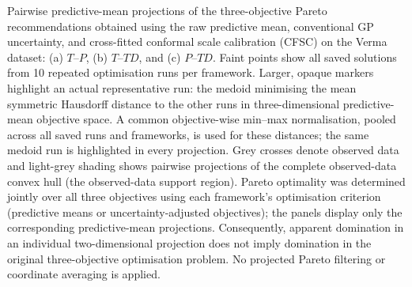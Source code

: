 \caption{Pairwise predictive-mean projections of the three-objective Pareto
recommendations obtained using the raw predictive mean, conventional GP
uncertainty, and cross-fitted conformal scale calibration (CFSC) on the Verma
dataset: (a) $T$--$P$, (b) $T$--$TD$, and (c) $P$--$TD$.
Faint points show all saved solutions from 10 repeated optimisation runs per framework.
Larger, opaque markers highlight an actual representative run:
the medoid minimising the mean symmetric Hausdorff distance to the other runs
in three-dimensional predictive-mean objective space. A common objective-wise
min--max normalisation, pooled across all saved runs and frameworks, is used
for these distances; the same medoid run is highlighted in every projection.
Grey crosses denote observed data and light-grey shading shows pairwise
projections of the complete observed-data convex hull (the observed-data
support region). Pareto optimality was determined jointly over all three
objectives using each framework's optimisation criterion (predictive means or
uncertainty-adjusted objectives); the panels display only the corresponding
predictive-mean projections. Consequently, apparent domination in an individual
two-dimensional projection does not imply domination in the original
three-objective optimisation problem. No projected Pareto filtering or
coordinate averaging is applied.}
\label{fig:verma-pf-framework-comparison}
